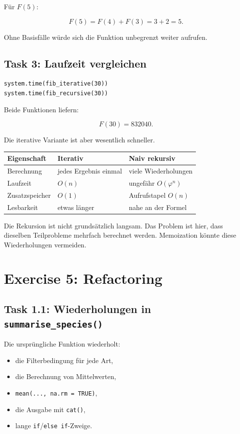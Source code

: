\documentclass[11pt,a4paper]{ctexart}
\begin{document}
Für \(F(5)\):

\[
F(5)=F(4)+F(3)=3+2=5.
\]

Ohne Basisfälle würde sich die Funktion unbegrenzt weiter aufrufen.

\subsection{Task 3: Laufzeit vergleichen}

\begin{lstlisting}
system.time(fib_iterative(30))
system.time(fib_recursive(30))
\end{lstlisting}

Beide Funktionen liefern:

\[
F(30)=832040.
\]

Die iterative Variante ist aber wesentlich schneller.

\begin{center}
\begin{tabular}{lll}
\toprule
Eigenschaft & Iterativ & Naiv rekursiv \\
\midrule
Berechnung & jedes Ergebnis einmal & viele Wiederholungen \\
Laufzeit & \(O(n)\) & ungefähr \(O(\varphi^n)\) \\
Zusatzspeicher & \(O(1)\) & Aufrufstapel \(O(n)\) \\
Lesbarkeit & etwas länger & nahe an der Formel \\
\bottomrule
\end{tabular}
\end{center}

Die Rekursion ist nicht grundsätzlich langsam. Das Problem ist hier, dass
dieselben Teilprobleme mehrfach berechnet werden. Memoization könnte diese
Wiederholungen vermeiden.

\section{Exercise 5: Refactoring}

\subsection{Task 1.1: Wiederholungen in \texttt{summarise\_species()}}

Die ursprüngliche Funktion wiederholt:

\begin{itemize}
  \item die Filterbedingung für jede Art,
  \item die Berechnung von Mittelwerten,
  \item \texttt{mean(..., na.rm = TRUE)},
  \item die Ausgabe mit \texttt{cat()},
  \item lange \texttt{if}/\texttt{else if}-Zweige.
\end{itemize}
\end{document}
